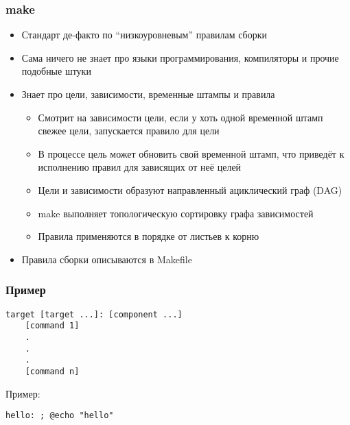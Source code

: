 \documentclass[xetex,mathserif,serif]{beamer}
\begin{document}
    \begin{frame}
        \frametitle{make}
        \begin{itemize}
            \item Стандарт де-факто по ``низкоуровневым'' правилам сборки
            \item Сама ничего не знает про языки программирования, компиляторы и прочие подобные штуки
            \item Знает про цели, зависимости, временные штампы и правила
            \begin{itemize}
                \item Смотрит на зависимости цели, если у хоть одной временной штамп свежее цели, запускается правило для цели
                \item В процессе цель может обновить свой временной штамп, что приведёт к исполнению правил для зависящих от неё целей
                \item Цели и зависимости образуют направленный ациклический граф (DAG)
                \item make выполняет топологическую сортировку графа зависимостей
                \item Правила применяются в порядке от листьев к корню
            \end{itemize}
            \item Правила сборки описываются в Makefile
        \end{itemize}
    \end{frame}

    \begin{frame}[fragile]
        \frametitle{Пример}
        \begin{footnotesize}
            \begin{verbatim}
target [target ...]: [component ...]
    [command 1]
    .
    .
    .
    [command n]
            \end{verbatim}
        \end{footnotesize}
        Пример:
        \begin{footnotesize}
            \begin{verbatim}
hello: ; @echo "hello"
            \end{verbatim}
        \end{footnotesize}
    \end{frame}
\end{document}
